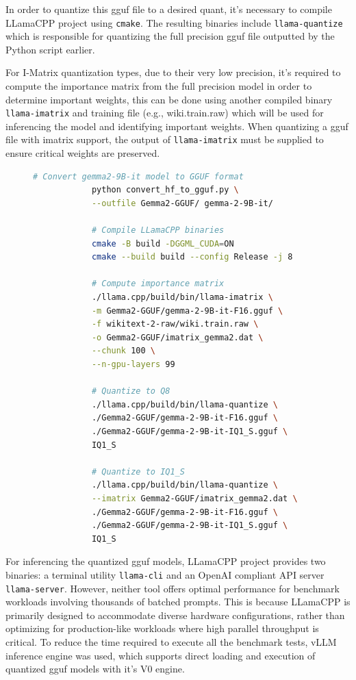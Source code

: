 \documentclass{ifacconf}
\begin{document}
	In order to quantize this \gls{gguf} file to a desired quant, it's necessary to compile LLamaCPP project using \verb|cmake|. The resulting binaries include \verb|llama-quantize| which is responsible for quantizing the full precision \gls{gguf} file outputted by the Python script earlier. 
	
	For I-Matrix quantization types, due to their very low precision, it's required to compute the importance matrix from the full precision model in order to determine important weights, this can be done using another compiled binary \verb|llama-imatrix| and training file (e.g., wiki.train.raw) which will be used for inferencing the model and identifying important weights. When quantizing a \gls{gguf} file with imatrix support, the output of \verb|llama-imatrix| must be supplied to ensure critical weights are preserved.
	
	\begin{figure}[H]
		\centering
		\begin{lstlisting}[language=bash,numbers=none]
			# Convert gemma2-9B-it model to GGUF format
			python convert_hf_to_gguf.py \
			--outfile Gemma2-GGUF/ gemma-2-9B-it/
			
			# Compile LLamaCPP binaries
			cmake -B build -DGGML_CUDA=ON
			cmake --build build --config Release -j 8
			
			# Compute importance matrix
			./llama.cpp/build/bin/llama-imatrix \
			-m Gemma2-GGUF/gemma-2-9B-it-F16.gguf \
			-f wikitext-2-raw/wiki.train.raw \
			-o Gemma2-GGUF/imatrix_gemma2.dat \
			--chunk 100 \
			--n-gpu-layers 99
			
			# Quantize to Q8
			./llama.cpp/build/bin/llama-quantize \
			./Gemma2-GGUF/gemma-2-9B-it-F16.gguf \
			./Gemma2-GGUF/gemma-2-9B-it-IQ1_S.gguf \
			IQ1_S
			
			# Quantize to IQ1_S
			./llama.cpp/build/bin/llama-quantize \
			--imatrix Gemma2-GGUF/imatrix_gemma2.dat \
			./Gemma2-GGUF/gemma-2-9B-it-F16.gguf \
			./Gemma2-GGUF/gemma-2-9B-it-IQ1_S.gguf \
			IQ1_S
		\end{lstlisting}
		\label{gguf-command}
	\end{figure}
	
	For inferencing the quantized \gls{gguf} models, LLamaCPP project provides two binaries: a terminal utility \verb|llama-cli| and an OpenAI compliant API server \verb|llama-server|. However, neither tool offers optimal performance for benchmark workloads involving thousands of batched prompts. This is because LLamaCPP is primarily designed to accommodate diverse hardware configurations, rather than optimizing for production-like workloads where high parallel throughput is critical. To reduce the time required to execute all the benchmark tests, vLLM \cite{vllm} inference engine was used, which supports direct loading and execution of quantized \gls{gguf} models with it's V0 engine.
	
\end{document}
